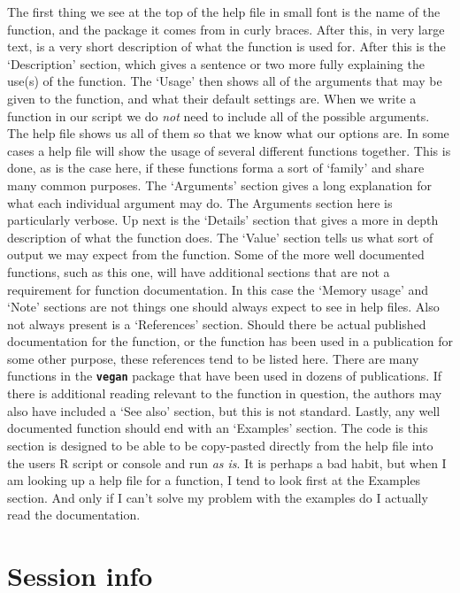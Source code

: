 \documentclass[]{book}
\theoremstyle{definition}
\theoremstyle{definition}
\theoremstyle{definition}
\theoremstyle{remark}
\begin{document}
The first thing we see at the top of the help file in small font is the
name of the function, and the package it comes from in curly braces.
After this, in very large text, is a very short description of what the
function is used for. After this is the `Description' section, which
gives a sentence or two more fully explaining the use(s) of the
function. The `Usage' then shows all of the arguments that may be given
to the function, and what their default settings are. When we write a
function in our script we do \emph{not} need to include all of the
possible arguments. The help file shows us all of them so that we know
what our options are. In some cases a help file will show the usage of
several different functions together. This is done, as is the case here,
if these functions forma a sort of `family' and share many common
purposes. The `Arguments' section gives a long explanation for what each
individual argument may do. The Arguments section here is particularly
verbose. Up next is the `Details' section that gives a more in depth
description of what the function does. The `Value' section tells us what
sort of output we may expect from the function. Some of the more well
documented functions, such as this one, will have additional sections
that are not a requirement for function documentation. In this case the
`Memory usage' and `Note' sections are not things one should always
expect to see in help files. Also not always present is a `References'
section. Should there be actual published documentation for the
function, or the function has been used in a publication for some other
purpose, these references tend to be listed here. There are many
functions in the \textbf{\texttt{vegan}} package that have been used in
dozens of publications. If there is additional reading relevant to the
function in question, the authors may also have included a `See also'
section, but this is not standard. Lastly, any well documented function
should end with an `Examples' section. The code is this section is
designed to be able to be copy-pasted directly from the help file into
the users R script or console and run \emph{as is}. It is perhaps a bad
habit, but when I am looking up a help file for a function, I tend to
look first at the Examples section. And only if I can't solve my problem
with the examples do I actually read the documentation.

\section{Session info}\label{session-info-2}
\end{document}
